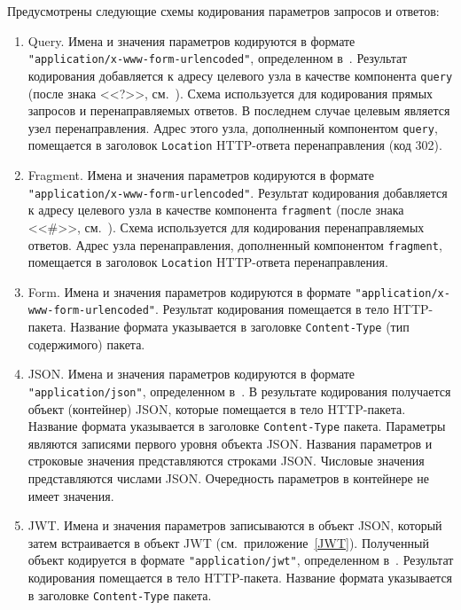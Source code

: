 Предусмотрены следующие схемы кодирования параметров запросов и ответов:
\begin{enumerate}
\item
Query. 
Имена и значения параметров кодируются в формате 
\lstinline{"application/x-www-form-urlencoded"}, определенном в~\cite{HTML4}. 
%
Результат кодирования добавляется к адресу целевого узла в качестве 
компонента \lstinline{query} (после знака <<?>>, см.~\cite{RFC3986}).
%
Схема используется для кодирования прямых запросов и перенаправляемых ответов.
%
В последнем случае целевым является узел перенаправления.
%
Адрес этого узла, дополненный компонентом \lstinline{query}, 
помещается в заголовок \lstinline{Location} HTTP-ответа перенаправления 
(код 302). 

\item
Fragment.
Имена и значения параметров кодируются в формате 
\lstinline{"application/x-www-form-urlencoded"}.
%
Результат кодирования добавляется к адресу целевого узла в качестве 
компонента \lstinline{fragment} (после знака <<\#>>, см.~\cite{RFC3986}).
%
Схема используется для кодирования перенаправляемых ответов.
%
Адрес узла перенаправления, дополненный компонентом \lstinline{fragment}, 
помещается в заголовок \lstinline{Location} HTTP-ответа перенаправления. 

\item
Form.
Имена и значения параметров кодируются в формате 
\lstinline{"application/x-www-form-urlencoded"}. 
%
Результат кодирования помещается в тело HTTP-пакета. 
%
Название формата указывается в заголовке \lstinline{Content-Type} 
(тип содержимого) пакета.  

\item
JSON.
Имена и значения параметров кодируются в формате \lstinline{"application/json"}, 
определенном в~\cite{RFC4627}. В результате кодирования получается объект 
(контейнер) JSON, которые помещается в тело HTTP-пакета. 
Название формата указывается в заголовке \lstinline{Content-Type} пакета. 
%
Параметры являются записями первого уровня объекта JSON.
Названия параметров и строковые значения представляются строками JSON.
Числовые значения представляются числами JSON.
Очередность параметров в контейнере не имеет значения.

\item
JWT.
Имена и значения параметров записываются в объект JSON, который затем 
встраивается в объект JWT (см.~приложение~\ref{JWT}).
%
Полученный объект кодируется в формате \lstinline{"application/jwt"}, 
определенном в~\cite{RFC7519}.
%
Результат кодирования помещается в тело HTTP-пакета. Название формата 
указывается в заголовке \lstinline{Content-Type} пакета. 


\end{enumerate}
